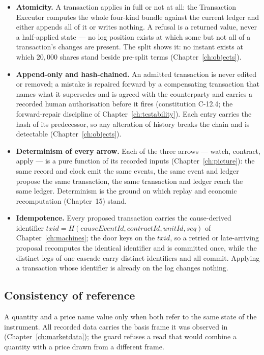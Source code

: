 \documentclass[11pt,a4paper]{article}
\begin{document}
\begin{itemize}[leftmargin=1.4em,itemsep=2pt]
\item \textbf{Atomicity.} A transaction applies in full or not at all: the
  Transaction Executor computes the whole four-kind bundle against the current
  ledger and either appends all of it or writes nothing. A refusal is a returned
  value, never a half-applied state --- no log position exists at which some but
  not all of a transaction's changes are present. The split shows it: no instant
  exists at which $20{,}000$ shares stand beside pre-split terms
  (Chapter~\ref{ch:objects}).
\item \textbf{Append-only and hash-chained.} An admitted transaction is never
  edited or removed; a mistake is repaired forward by a compensating transaction that
  names what it supersedes and is agreed with the counterparty and carries a recorded human
  authorisation before it fires
  (constitution C-12.4; the forward-repair discipline of Chapter~\ref{ch:testability}).
  Each entry carries the hash of its predecessor, so
  any alteration of history breaks the chain and is detectable
  (Chapter~\ref{ch:objects}).
\item \textbf{Determinism of every arrow.} Each of the three arrows --- watch,
  contract, apply --- is a pure function of its recorded inputs
  (Chapter~\ref{ch:picture}): the same record and clock emit the same events, the
  same event and ledger propose the same transaction, the same transaction and
  ledger reach the same ledger. Determinism is the ground on which replay and
  economic recomputation (Chapter~15) stand.
\item \textbf{Idempotence.} Every proposed transaction carries the cause-derived
  identifier $\mathit{txid}=H(\mathit{causeEventId},\mathit{contractId},\mathit{unitId},\mathit{seq})$
  of Chapter~\ref{ch:machines}; the door keys on the $\mathit{txid}$, so a retried or
  late-arriving proposal recomputes the identical identifier and is committed once,
  while the distinct legs of one cascade carry distinct identifiers and all commit.
  Applying a transaction whose identifier is already on the log changes nothing.
\end{itemize}

\subsection{Consistency of reference}

A quantity and a price name value only when both refer to the same state of the
instrument. All recorded data carries the basis frame it was observed in
(Chapter~\ref{ch:marketdata}); the guard refuses a read that would combine a
quantity with a price drawn from a different frame.
\end{document}
